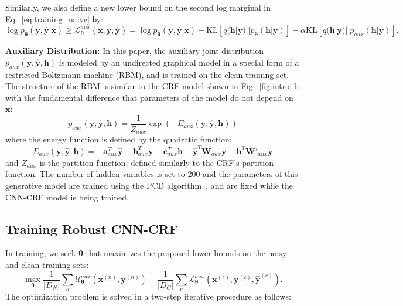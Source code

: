 \documentclass{article}
\newcommand{\x}{{\pmb{x}}}
\newcommand{\y}{{\pmb{y}}}
\newcommand{\yh}{{\hat{\pmb{y}}}}
\newcommand{\h}{{\pmb{h}}}
\renewcommand{\a}{{\pmb{a}}}
\renewcommand{\b}{{\pmb{b}}}
\renewcommand{\c}{{\pmb{c}}}
\newcommand{\W}{{\pmb{W}}}
\newcommand{\Wp}{{\pmb{W'}}}
\newcommand{\btheta}{{\pmb{\theta}}}
\renewcommand{\L}{{\mathcal{L}}}
\newcommand{\U}{{\mathcal{U}}}
\def\KL{\text{KL}}
\begin{document}
Similarly, we also define a new lower bound on the second log marginal in Eq.~\ref{eq:training_naive} by:
{\small \begin{equation*} %
\log p_\btheta(\y, \yh|\x) \geq \L^{aux}_{\btheta}(\x, \y, \yh) = \log p_\btheta(\y, \yh|\x) - \KL[q(\h| \y) || p_\btheta(\h| \y)] - \alpha \KL[q(\h| \y) || p_{aux}(\h| \y)].
\end{equation*}}

\textbf{Auxiliary Distribution:} In this paper, the auxiliary joint distribution $p_{aux}(\y, \yh, \h)$ is modeled by an undirected graphical model in a special form of a restricted Boltzmann machine (RBM),
and is trained on the clean training set. The structure of the RBM is similar to the CRF model shown in
Fig.~\ref{fig:intro}.b with the fundamental difference that parameters of the model do not depend on $\x$:
\begin{equation} \label{eq:rbm_prob}
p_{aux}(\y, \yh, \h) = \frac{1}{Z_{aux}} \exp(-E_{aux}(\y, \yh, \h))
\end{equation}
where the energy function is defined by the quadratic function:
\begin{equation} \label{eq:rbm_energy}
E_{aux}(\y, \yh, \h) = - \a^T_{aux} \yh - \b^T_{aux} \y  - \c^T_{aux} \h - \yh^T \W_{aux} \y - \h^T \Wp_{aux} \y
\end{equation}
and $Z_{aux}$ is the partition function, defined similarly to the CRF's partition function. The number of hidden variables is set to 200 and the parameters of 
this generative model are trained using the PCD algorithm~\cite{tieleman2008training}, and are fixed while the CNN-CRF model is being trained.

\subsection{Training Robust CNN-CRF}
In training, we seek $\btheta$ that maximizes the proposed lower bounds on the noisy and clean training sets:
{\small
\begin{equation} \label{eq:training}
\max_{\btheta} \frac{1}{|D_N|} \sum_n  \U^{aux}_{\btheta}(\x^{(n)}, \y^{(n)}) + \frac{1}{|D_C|} \sum_c \L^{aux}_{\btheta}(\x^{(c)}, \y^{(c)}, \yh^{(c)}).
\end{equation}}
The optimization problem is solved in a two-step iterative procedure as follows:
\end{document}
